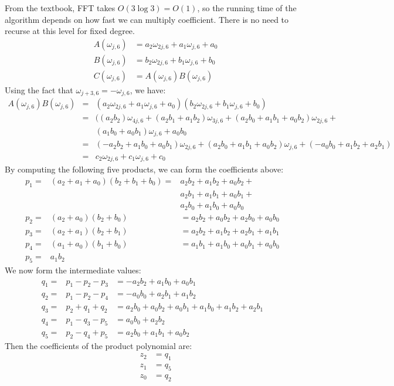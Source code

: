 \documentclass[12pt]{article}
\begin{document}
From the textbook, FFT takes $O(3\log{3}) = O(1)$, so the running time
of the algorithm depends on how fast we can multiply
coefficient. There is no need to recurse at this level for fixed degree.
\begin{eqnarray*}
& A(\omega_{j,6}) & = a_2\omega_{2j,6} + a_1\omega_{j,6} + a_0\\
& B(\omega_{j,6}) & = b_2\omega_{2j,6} + b_1\omega_{j,6} + b_0\\
& C(\omega_{j,6}) & = A(\omega_{j,6})B(\omega_{j,6})
\end{eqnarray*}
Using the fact that $\omega_{j+3,6} = -\omega_{j,6}$, we have:
\begin{eqnarray*}
A(\omega_{j,6})B(\omega_{j,6}) & = &
(a_2\omega_{2j,6} + a_1\omega_{j,6} + a_0)
(b_2\omega_{2j,6} + b_1\omega_{j,6} + b_0)\\
                             &  = &
((a_2b_2)\omega_{4j,6} + (a_2b_1 + a_1b_2)\omega_{3j,6} +
(a_2b_0 + a_1b_1 + a_0b_2)\omega_{2j,6} +\\
                             &  &
(a_1b_0 + a_0b_1)\omega_{j,6} +
a_0b_0\\
                             & = &
(-a_2b_2 + a_1b_0 + a_0b_1)\omega_{2j,6} +
(a_2b_0 + a_1b_1 + a_0b_2)\omega_{j,6} +
(-a_0b_0 + a_1b_2 + a_2b_1)\\
                                & = & c_2\omega_{2j,6} + c_1\omega_{j,6} + c_0
\end{eqnarray*}
By computing the following five products, we can form the coefficients
above:
\begin{eqnarray*}
p_1 = & (a_2 + a_1 + a_0)(b_2 + b_1 + b_0) 
      = & a_2b_2 + a_1b_2 + a_0b_2 +\\
     & & a_2b_1 + a_1b_1 + a_0b_1 +\\
     & & a_2b_0 + a_1b_0 + a_0b_0 \\
p_2 = & (a_2 + a_0)(b_2 + b_0)             & 
    = a_2b_2 + a_0b_2 + a_2b_0 + a_0b_0\\
p_3 = & (a_2 + a_1)(b_2 + b_1)             & 
    = a_2b_2 + a_1b_2 + a_2b_1 + a_1b_1\\
p_4 = & (a_1 + a_0)(b_1 + b_0)             & 
    = a_1b_1 + a_1b_0 + a_0b_1 + a_0b_0\\
p_5 = & a_1b_2
\end{eqnarray*}
We now form the intermediate values:
\begin{eqnarray*}
q_1 = & p_1 - p_2 - p_3 & = -a_2b_2 + a_1b_0 + a_0b_1\\
q_2 = & p_1 - p_2 - p_4 & = -a_0b_0 + a_2b_1 + a_1b_2\\
q_3 = & p_2 + q_1 + q_2 & = a_2b_0 + a_0b_2 + a_0b_1 + a_1b_0 + a_1b_2 + a_2b_1\\
q_4 = & p_1 - q_3 - p_5 & = a_0b_0 + a_2b_2\\
q_5 = & p_2 - q_4 + p_5 &= a_2b_0 + a_1b_1 + a_0b_2
\end{eqnarray*}
Then the coefficients of the product polynomial are:
\begin{eqnarray*}
& z_2 & = q_1 \\
& z_1 & = q_5 \\
& z_0 & = q_2
\end{eqnarray*}
\end{document}
